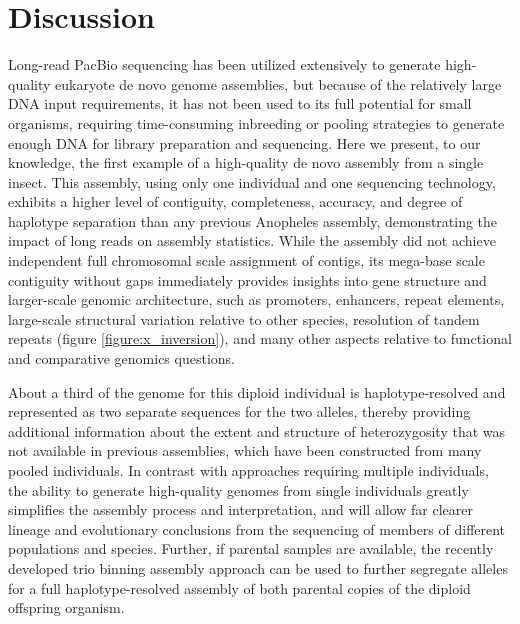 \section{Discussion}

\par{
Long-read PacBio sequencing has been utilized extensively to generate high-quality eukaryote de novo genome assemblies, but because of the relatively large DNA input requirements, it has not been used to its full potential for small organisms, requiring time-consuming inbreeding or pooling strategies to generate enough DNA for library preparation and sequencing. Here we present, to our knowledge, the first example of a high-quality de novo assembly from a single insect. This assembly, using only one individual and one sequencing technology, exhibits a higher level of contiguity, completeness, accuracy, and degree of haplotype separation than any previous Anopheles assembly, demonstrating the impact of long reads on assembly statistics. While the assembly did not achieve independent full chromosomal scale assignment of contigs, its mega-base scale contiguity without gaps immediately provides insights into gene structure and larger-scale genomic architecture, such as promoters, enhancers, repeat elements, large-scale structural variation relative to other species, resolution of tandem repeats (figure \ref{figure:x_inversion}), and many other aspects relative to functional and comparative genomics questions.
} \\
\par{
About a third of the genome for this diploid individual is haplotype-resolved and represented as two separate sequences for the two alleles, thereby providing additional information about the extent and structure of heterozygosity that was not available in previous assemblies, which have been constructed from many pooled individuals. In contrast with approaches requiring multiple individuals, the ability to generate high-quality genomes from single individuals greatly simplifies the assembly process and interpretation, and will allow far clearer lineage and evolutionary conclusions from the sequencing of members of different populations and species. Further, if parental samples are available, the recently developed trio binning assembly approach \cite{triobinning} can be used to further segregate alleles for a full haplotype-resolved assembly of both parental copies of the diploid offspring organism.
} \\
